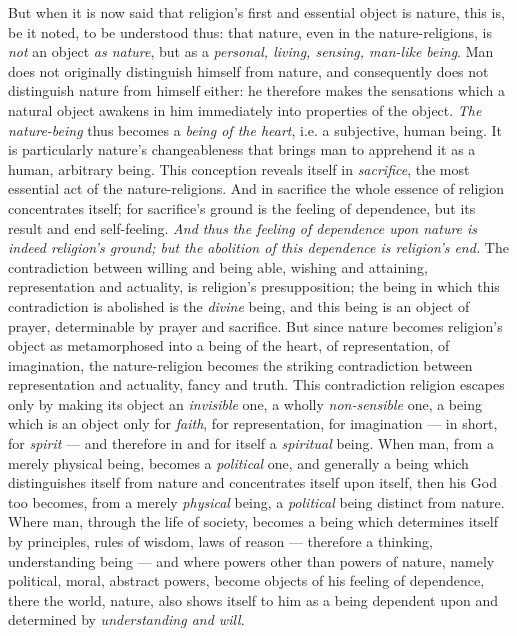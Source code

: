 \documentclass[12pt,a4paper]{book}
\begin{document}
But when it is now said that religion's first and essential object is nature,
this is, be it noted, to be understood thus: that nature, even in the
nature-religions, is \emph{not} an object \emph{as nature}, but as a
\emph{personal, living, sensing, man-like being}. Man does not originally
distinguish himself from nature, and consequently does not distinguish nature
from himself either: he therefore makes the sensations which a natural object
awakens in him immediately into properties of the object. \emph{The
nature-being} thus becomes a \emph{being of the heart}, i.e. a subjective,
human being.
It is particularly nature's changeableness that brings man to apprehend it as
a human, arbitrary being. This conception reveals itself in \emph{sacrifice},
the most essential act of the nature-religions. And in sacrifice the whole
essence of religion concentrates itself; for sacrifice's ground is the feeling
of dependence, but its result and end self-feeling. \emph{And thus the feeling
of dependence upon nature is indeed religion's ground; but the abolition of
this dependence is religion's end.} The contradiction between willing and
being able, wishing and attaining, representation and actuality, is religion's
presupposition; the being in which this contradiction is abolished is the
\emph{divine} being, and this being is an object of prayer, determinable by
prayer and sacrifice. But since nature becomes religion's object as
metamorphosed into a being of the heart, of representation, of imagination,
the nature-religion becomes the striking contradiction between representation
and actuality, fancy and truth. This contradiction religion escapes only by
making its object an \emph{invisible} one, a wholly \emph{non-sensible} one, a
being which is an object only for \emph{faith}, for representation, for
imagination --- in short, for \emph{spirit} --- and therefore in and for
itself a \emph{spiritual} being. When man, from a merely physical being,
becomes a \emph{political} one, and generally a being which distinguishes
itself from nature and concentrates itself upon itself, then his God too
becomes, from a merely \emph{physical} being, a \emph{political} being
distinct from nature. Where man, through the life of society, becomes a being
which determines itself by principles, rules of wisdom, laws of reason ---
therefore a thinking, understanding being --- and where powers other than
powers of nature, namely political, moral, abstract powers, become objects of
his feeling of dependence, there the world, nature, also shows itself to him
as a being dependent upon and determined by \emph{understanding and will}.
\end{document}
